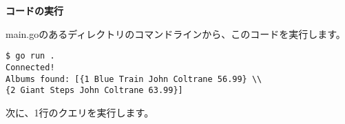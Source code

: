 \textbf{コードの実行}

main.goのあるディレクトリのコマンドラインから、このコードを実行します。

\begin{lstlisting}[numbers=none]
$ go run .
Connected!
Albums found: [{1 Blue Train John Coltrane 56.99} \\
{2 Giant Steps John Coltrane 63.99}]
\end{lstlisting}

次に、1行のクエリを実行します。
